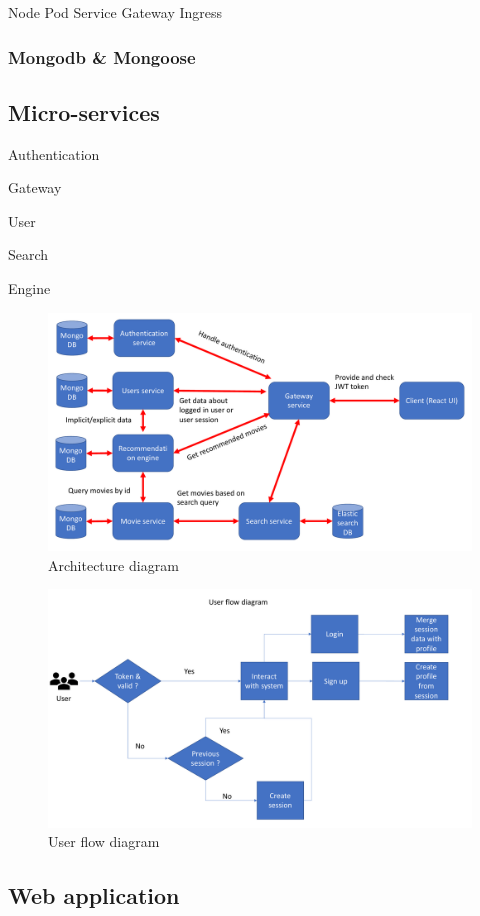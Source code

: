 Node 
Pod
Service
Gateway
Ingress

\subsubsection{Mongodb \& Mongoose}

\subsection{Micro-services}
Authentication

Gateway

User

Search

Engine

\begin{figure}[h!]
    \includegraphics[scale=0.4]{architecture_diagram}
    \caption{Architecture diagram}
\end{figure}

\begin{figure}[h!]
    \includegraphics[scale=0.4]{user_flow_diagram}
    \caption{User flow diagram}
\end{figure}

\subsection{Web application}